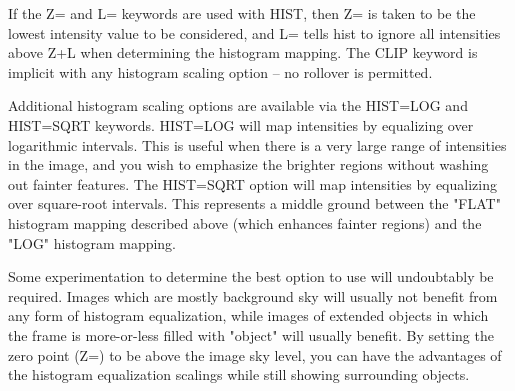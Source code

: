 If the Z= and L= keywords are used with HIST, then Z= is taken to be the
lowest intensity value to be considered, and L= tells hist to ignore all
intensities above Z+L when determining the histogram mapping.  The CLIP
keyword is implicit with any histogram scaling option -- no rollover is
permitted.

Additional histogram scaling options are available via the HIST=LOG and
HIST=SQRT keywords.  HIST=LOG will map intensities by equalizing over
logarithmic intervals.  This is useful when there is a very large range of
intensities in the image, and you wish to emphasize the brighter regions
without washing out fainter features.  The HIST=SQRT option will map
intensities by equalizing over square-root intervals.  This represents a
middle ground between the "FLAT" histogram mapping described above (which
enhances fainter regions) and the "LOG" histogram mapping.

Some experimentation to determine the best option to use will undoubtably
be required.  Images which are mostly background sky will usually not
benefit from any form of histogram equalization, while images of extended
objects in which the frame is more-or-less filled with "object" will
usually benefit.  By setting the zero point (Z=) to be above the image sky
level, you can have the advantages of the histogram equalization scalings
while still showing surrounding objects.



